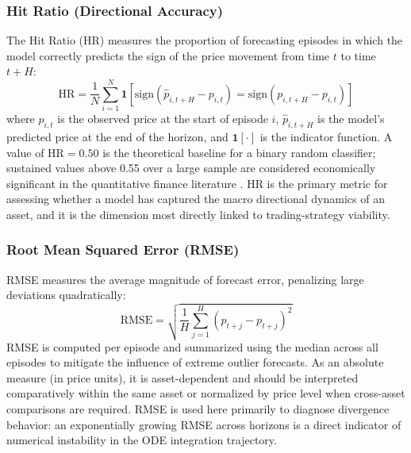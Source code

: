 \documentclass[11pt,a4paper]{article}
\begin{document}
\subsubsection{Hit Ratio (Directional Accuracy)}
The Hit Ratio (HR) measures the proportion of forecasting episodes in which the model correctly predicts the sign of the price movement from time $t$ to time $t+H$:
\begin{equation}
    \text{HR} = \frac{1}{N} \sum_{i=1}^{N} \mathbf{1}\left[\text{sign}\!\left(\hat{p}_{i,t+H} - p_{i,t}\right) = \text{sign}\!\left(p_{i,t+H} - p_{i,t}\right)\right]
\end{equation}
where $p_{i,t}$ is the observed price at the start of episode $i$, $\hat{p}_{i,t+H}$ is the model's predicted price at the end of the horizon, and $\mathbf{1}[\cdot]$ is the indicator function. A value of $\text{HR} = 0.50$ is the theoretical baseline for a binary random classifier; sustained values above 0.55 over a large sample are considered economically significant in the quantitative finance literature \cite{diebold1995comparing}. HR is the primary metric for assessing whether a model has captured the macro directional dynamics of an asset, and it is the dimension most directly linked to trading-strategy viability.

\subsubsection{Root Mean Squared Error (RMSE)}
RMSE measures the average magnitude of forecast error, penalizing large deviations quadratically:
\begin{equation}
    \text{RMSE} = \sqrt{\frac{1}{H} \sum_{j=1}^{H} \left(\hat{p}_{t+j} - p_{t+j}\right)^2}
\end{equation}
RMSE is computed per episode and summarized using the median across all episodes to mitigate the influence of extreme outlier forecasts. As an absolute measure (in price units), it is asset-dependent and should be interpreted comparatively within the same asset or normalized by price level when cross-asset comparisons are required. RMSE is used here primarily to diagnose divergence behavior: an exponentially growing RMSE across horizons is a direct indicator of numerical instability in the ODE integration trajectory.
\end{document}
